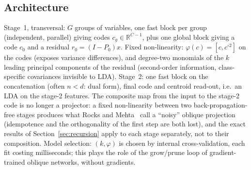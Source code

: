 \documentclass[11pt,a4paper]{article}
\theoremstyle{plain}
\theoremstyle{definition}
\theoremstyle{remark}
\newcommand{\R}{\mathbb R}
\begin{document}
\subsection{Architecture}
Stage~1, transversal: $G$ groups of variables, one fast block per group
(independent, parallel) giving codes $c_g\in\R^{C-1}$, plus one global block
giving a code $c_0$ and a residual $r_0=(I-P_0)x$. Fixed non-linearity:
$\varphi(c)=[c,c^{\circ2}]$ on the codes (exposes variance differences), and
degree-two monomials of the $k$ leading principal components of the residual
(second-order information, class-specific covariances invisible to LDA).
Stage~2: one fast block on the concatenation (often $n<d$: dual form), final
code and centroid read-out, i.e.\ an LDA on the stage-2 features. The composite map from the input to the
stage-2 code is no longer a projector: a fixed non-linearity between two
back-propagation-free stages produces what Rocks and Mehta~\cite{rocksmehta2021} call a
``noisy'' oblique projection (idempotence and the orthogonality of the first
step are both lost), and the exact results of Section~\ref{sec:recursion}
apply to each stage separately, not to their composition. Model
selection: $(k,\varphi)$ is chosen by internal cross-validation, each fit
costing milliseconds; this plays the role of the grow/prune loop of
gradient-trained oblique networks, without gradients.
\end{document}
